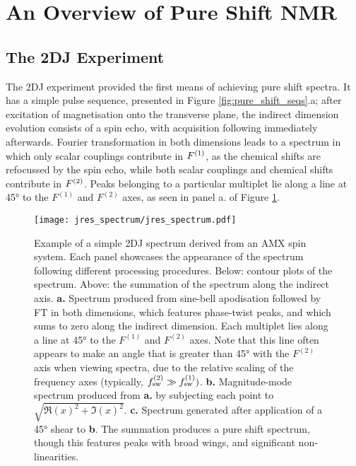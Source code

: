\section{An Overview of Pure Shift NMR}

\subsection{The \acl{2DJ} Experiment}
The \ac{2DJ} experiment\cite{Aue1976, Morris2009} provided the first means of
achieving pure shift spectra. It has a simple pulse sequence, presented in
Figure \ref{fig:pure_shift_seqs}.a; after excitation of magnetisation onto the
transverse plane, the indirect dimension evolution consists of a spin echo, with
acquisition following immediately afterwards. Fourier transformation in both
dimensions leads to a spectrum in which only scalar couplings contribute in
$F^{(1)}$, as the chemical shifts are refocussed by the spin echo, while both
scalar couplings and chemical shifts contribute in $F^{(2)}$.
Peaks belonging to a particular multiplet lie along a line at \ang{45} to the
$F^{(1)}$ and $F^{(2)}$ axes, as seen in panel a. of Figure
\ref{fig:jres_spectrum}.
\begin{figure}%
    \centering%
    \texttt{[image: jres\_spectrum/jres\_spectrum.pdf]}%
    \caption[
        Example of a simple \acs{2DJ} spectra derived from an AMX spin system,
        processes in different ways.
    ]
    {%
        Example of a simple \acs{2DJ} spectrum derived from an AMX spin system.
        Each panel showcases the appearance of the spectrum following different
        processing procedures. Below: contour plots of the spectrum. Above: the
        summation of the spectrum along the indirect axis.
        \textbf{a.} Spectrum produced from sine-bell apodisation followed by
        \ac{FT} in both dimensions, which features phase-twist peaks, and which
        sums to zero along the indirect dimension. Each multiplet lies along a
        line at \ang{45} to the $F^{(1)}$ and $F^{(2)}$ axes. Note that this
        line often appears to make an angle that is greater than \ang{45} with
        the $F^{(2)}$ axis when viewing spectra, due to the relative scaling of
        the frequency axes (typically, $f_{\mathrm{sw}}^{(2)} \gg f_{\mathrm{sw}}^{(1)})$.
        \textbf{b.} Magnitude-mode spectrum produced from \textbf{a.} by
        subjecting each point to $\sqrt{\Re(x)^2 + \Im(x)^2}$.
        \textbf{c.} Spectrum generated after application of a \ang{45} shear to
        \textbf{b}.  The summation produces a pure shift spectrum, though this
        features peaks with broad wings, and significant non-linearities.
   }%
    \label{fig:jres_spectrum}%
\end{figure}%

